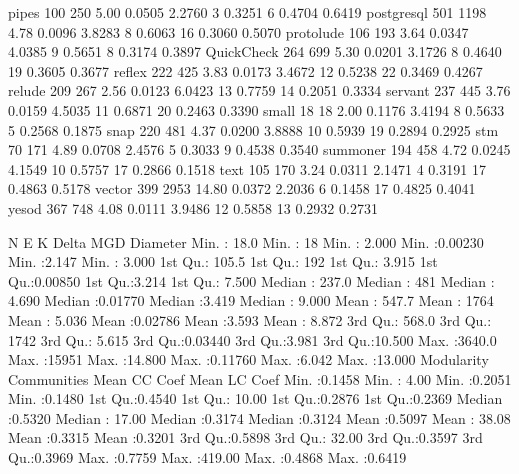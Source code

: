 \documentclass[12pt, a4paper]{article}
\begin{document}
pipes       100   250  5.00 0.0505 2.2760  3       0.3251       6         0.4704       0.6419      
postgresql  501  1198  4.78 0.0096 3.8283  8       0.6063      16         0.3060       0.5070      
protolude   106   193  3.64 0.0347 4.0385  9       0.5651       8         0.3174       0.3897      
QuickCheck  264   699  5.30 0.0201 3.1726  8       0.4640      19         0.3605       0.3677      
reflex      222   425  3.83 0.0173 3.4672 12       0.5238      22         0.3469       0.4267      
relude      209   267  2.56 0.0123 6.0423 13       0.7759      14         0.2051       0.3334      
servant     237   445  3.76 0.0159 4.5035 11       0.6871      20         0.2463       0.3390      
small        18    18  2.00 0.1176 3.4194  8       0.5633       5         0.2568       0.1875      
snap        220   481  4.37 0.0200 3.8888 10       0.5939      19         0.2894       0.2925      
stm          70   171  4.89 0.0708 2.4576  5       0.3033       9         0.4538       0.3540      
summoner    194   458  4.72 0.0245 4.1549 10       0.5757      17         0.2866       0.1518      
text        105   170  3.24 0.0311 2.1471  4       0.3191      17         0.4863       0.5178      
vector      399  2953 14.80 0.0372 2.2036  6       0.1458      17         0.4825       0.4041      
yesod       367   748  4.08 0.0111 3.9486 12       0.5858      13         0.2932       0.2731      

N                E               K              Delta              MGD           Diameter     
Min.   :  18.0   Min.   :   18   Min.   : 2.000   Min.   :0.00230   Min.   :2.147   Min.   : 3.000  
1st Qu.: 105.5   1st Qu.:  192   1st Qu.: 3.915   1st Qu.:0.00850   1st Qu.:3.214   1st Qu.: 7.500  
Median : 237.0   Median :  481   Median : 4.690   Median :0.01770   Median :3.419   Median : 9.000  
Mean   : 547.7   Mean   : 1764   Mean   : 5.036   Mean   :0.02786   Mean   :3.593   Mean   : 8.872  
3rd Qu.: 568.0   3rd Qu.: 1742   3rd Qu.: 5.615   3rd Qu.:0.03440   3rd Qu.:3.981   3rd Qu.:10.500  
Max.   :3640.0   Max.   :15951   Max.   :14.800   Max.   :0.11760   Max.   :6.042   Max.   :13.000  
  Modularity      Communities      Mean CC Coef     Mean LC Coef   
Min.   :0.1458   Min.   :  4.00   Min.   :0.2051   Min.   :0.1480  
1st Qu.:0.4540   1st Qu.: 10.00   1st Qu.:0.2876   1st Qu.:0.2369  
Median :0.5320   Median : 17.00   Median :0.3174   Median :0.3124  
Mean   :0.5097   Mean   : 38.08   Mean   :0.3315   Mean   :0.3201  
3rd Qu.:0.5898   3rd Qu.: 32.00   3rd Qu.:0.3597   3rd Qu.:0.3969  
Max.   :0.7759   Max.   :419.00   Max.   :0.4868   Max.   :0.6419 
\end{document}
